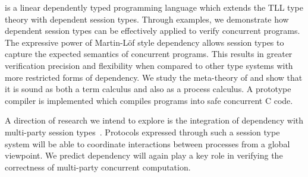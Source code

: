 \TLLC{} is a linear dependently typed programming language which extends the TLL
type theory with dependent session types. Through examples, we demonstrate how
dependent session types can be effectively applied to verify concurrent
programs. The expressive power of Martin-L\"{o}f style dependency allows \TLLC{}
session types to capture the expected semantics of concurrent programs. This
results in greater verification precision and flexibility when compared to other
type systems with more restricted forms of dependency. We study the meta-theory
of \TLLC{} and show that it is sound as both a term calculus and also as a
process calculus. A prototype compiler is implemented which compiles \TLLC{}
programs into safe concurrent C code.

A direction of research we intend to explore is the integration of dependency
with multi-party session types~\cite{honda16}. Protocols expressed through such
a session type system will be able to coordinate interactions between processes
from a global viewpoint. We predict dependency will again play a key role in
verifying the correctness of multi-party concurrent computation.

